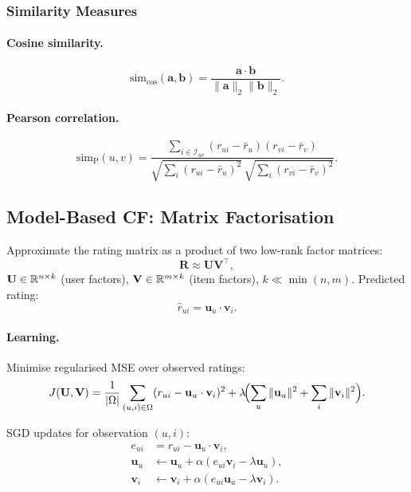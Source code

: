 \subsubsection{Similarity Measures}

\paragraph{Cosine similarity.}
\[\mathrm{sim}_{\cos}(\mathbf{a},\mathbf{b})=\frac{\mathbf{a}\cdot\mathbf{b}}{\|\mathbf{a}\|_2\|\mathbf{b}\|_2}.\]

\paragraph{Pearson correlation.}
\[\mathrm{sim}_{\text{P}}(u,v)=\frac{\sum_{i\in\mathcal{I}_{uv}}(r_{ui}-\bar{r}_u)(r_{vi}-\bar{r}_v)}
{\sqrt{\sum_i(r_{ui}-\bar{r}_u)^2}\,\sqrt{\sum_i(r_{vi}-\bar{r}_v)^2}}.\]

\subsection{Model-Based CF: Matrix Factorisation}

Approximate the rating matrix as a product of two low-rank factor matrices:
\begin{equation}
\mathbf{R}\approx\mathbf{U}\mathbf{V}^{\!\top},
\label{eq:mf}
\end{equation}
$\mathbf{U}\in\mathbb{R}^{n\times k}$ (user factors), $\mathbf{V}\in\mathbb{R}^{m\times k}$
(item factors), $k\ll\min(n,m)$. Predicted rating:
\[\hat{r}_{ui}=\mathbf{u}_u\cdot\mathbf{v}_i.\]

\paragraph{Learning.} Minimise regularised MSE over observed ratings:
\begin{equation}
J(\mathbf{U},\mathbf{V})=\frac{1}{|\Omega|}\sum_{(u,i)\in\Omega}
(r_{ui}-\mathbf{u}_u\cdot\mathbf{v}_i)^2
+\lambda\!\Bigl(\sum_u\|\mathbf{u}_u\|^2+\sum_i\|\mathbf{v}_i\|^2\Bigr).
\end{equation}

SGD updates for observation $(u,i)$:
\begin{align}
e_{ui}&=r_{ui}-\mathbf{u}_u\cdot\mathbf{v}_i,\\
\mathbf{u}_u&\leftarrow\mathbf{u}_u+\alpha(e_{ui}\mathbf{v}_i-\lambda\mathbf{u}_u),\\
\mathbf{v}_i&\leftarrow\mathbf{v}_i+\alpha(e_{ui}\mathbf{u}_u-\lambda\mathbf{v}_i).
\end{align}

